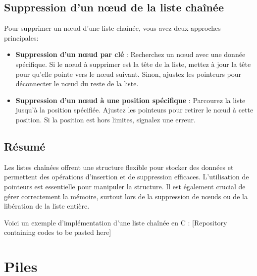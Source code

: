 \subsection{Suppression d'un nœud de la liste chaînée}

Pour supprimer un nœud d'une liste chaînée, vous avez deux approches principales:

\begin{itemize}
	\item \textbf{Suppression d'un nœud par clé} : Recherchez un nœud avec une donnée spécifique. Si le nœud à supprimer est la tête de la liste, mettez à jour la tête pour qu'elle pointe vers le nœud suivant. Sinon, ajustez les pointeurs pour déconnecter le nœud du reste de la liste.
	
	\item \textbf{Suppression d'un nœud à une position spécifique} : Parcourez la liste jusqu'à la position spécifiée. Ajustez les pointeurs pour retirer le nœud à cette position. Si la position est hors limites, signalez une erreur.
\end{itemize}

%

\subsection{Résumé}

Les listes chaînées offrent une structure flexible pour stocker des données et permettent des opérations d'insertion et de suppression efficaces. L'utilisation de pointeurs est essentielle pour manipuler la structure. Il est également crucial de gérer correctement la mémoire, surtout lors de la suppression de nœuds ou de la libération de la liste entière.

Voici un exemple d'implémentation d'une liste chaînée en C : [Repository containing codes to be pasted here]

\section{Piles}

